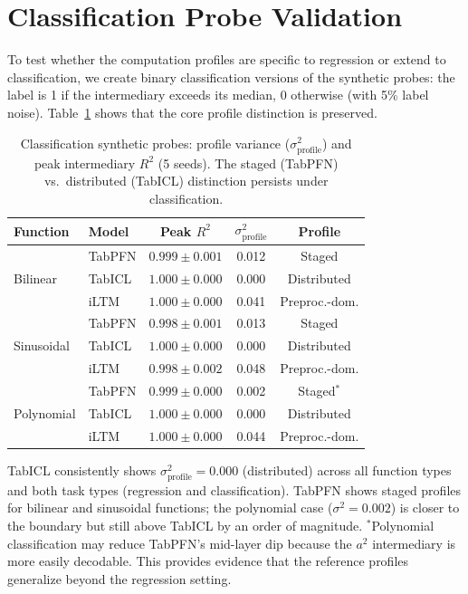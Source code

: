 \documentclass{article}
\begin{document}
\section{Classification Probe Validation}
\label{app:classification-probes}

To test whether the computation profiles are specific to regression or extend to classification, we create binary classification versions of the synthetic probes: the label is 1 if the intermediary exceeds its median, 0 otherwise (with 5\% label noise). Table~\ref{tab:classif-probes} shows that the core profile distinction is preserved.

\begin{table}[htbp]
\centering
\caption{Classification synthetic probes: profile variance ($\sigma^2_\text{profile}$) and peak intermediary $R^2$ (5 seeds). The staged (TabPFN) vs.\ distributed (TabICL) distinction persists under classification.}
\label{tab:classif-probes}
\small
\begin{tabular}{@{}l l cc c@{}}
\toprule
Function & Model & Peak $R^2$ & $\sigma^2_\text{profile}$ & Profile \\
\midrule
\multirow{3}{*}{Bilinear} & TabPFN & $0.999 \pm 0.001$ & 0.012 & Staged \\
 & TabICL & $1.000 \pm 0.000$ & 0.000 & Distributed \\
 & iLTM & $1.000 \pm 0.000$ & 0.041 & Preproc.-dom. \\
\midrule
\multirow{3}{*}{Sinusoidal} & TabPFN & $0.998 \pm 0.001$ & 0.013 & Staged \\
 & TabICL & $1.000 \pm 0.000$ & 0.000 & Distributed \\
 & iLTM & $0.998 \pm 0.002$ & 0.048 & Preproc.-dom. \\
\midrule
\multirow{3}{*}{Polynomial} & TabPFN & $0.999 \pm 0.000$ & 0.002 & Staged$^{*}$ \\
 & TabICL & $1.000 \pm 0.000$ & 0.000 & Distributed \\
 & iLTM & $1.000 \pm 0.000$ & 0.044 & Preproc.-dom. \\
\bottomrule
\end{tabular}
\end{table}

\noindent TabICL consistently shows $\sigma^2_\text{profile} = 0.000$ (distributed) across all function types and both task types (regression and classification). TabPFN shows staged profiles for bilinear and sinusoidal functions; the polynomial case ($\sigma^2 = 0.002$) is closer to the boundary but still above TabICL by an order of magnitude. $^{*}$Polynomial classification may reduce TabPFN's mid-layer dip because the $a^2$ intermediary is more easily decodable. This provides evidence that the reference profiles generalize beyond the regression setting.
\end{document}
